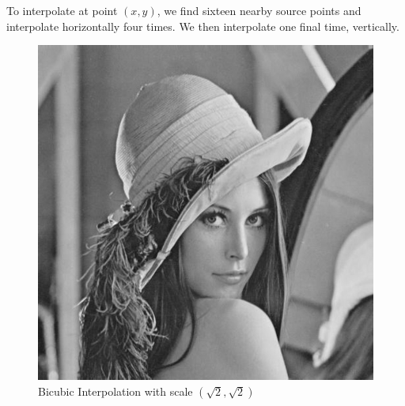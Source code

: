 To interpolate at point $(x, y)$, we find sixteen nearby source points and interpolate horizontally four times. We then interpolate one final time, vertically. 
\begin{figure}[H]
    \centering
    \includegraphics[scale=0.5]{images/lenna-bicubic.jpg}
    \caption{Bicubic Interpolation with scale $(\sqrt{2}, \sqrt{2})$}
    \label{fig:bicubic}
\end{figure}